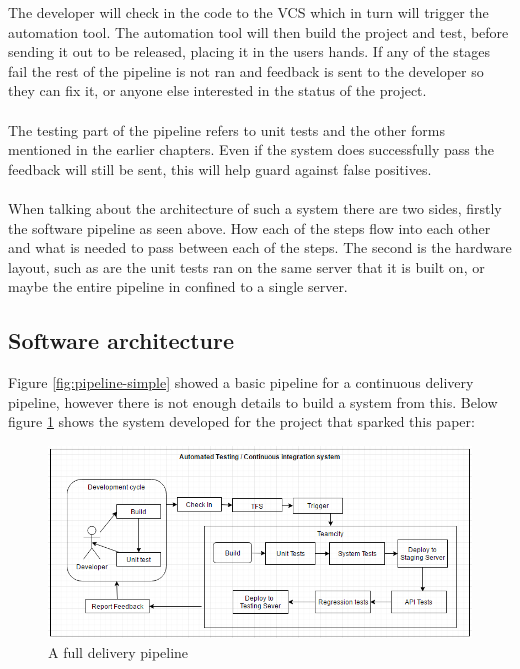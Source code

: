 The developer will check in the code to the VCS which in turn will trigger the automation tool. The automation tool will then build the project and test, before sending it out to be released, placing it in the users hands. If any of the stages fail the rest of the pipeline is not ran and feedback is sent to the developer so they can fix it, or anyone else interested in the status of the project. 
\\\\
The testing part of the pipeline refers to unit tests and the other forms mentioned in the earlier chapters. Even if the system does successfully pass the feedback will still be sent, this will help guard against false positives.
\\\\
When talking about the architecture of such a system there are two sides, firstly the software pipeline as seen above. How each of the steps flow into each other and what is needed to pass between each of the steps. The second is the hardware layout,  such as are the unit tests ran on the same server that it is built on, or maybe the entire pipeline in confined to a single server.

\subsection{Software architecture}
\label{sec:testing}

Figure \ref{fig:pipeline-simple} showed a basic pipeline for a continuous delivery pipeline, however there is not enough details to build a system from this. Below figure \ref{fig:bsipipeline} shows the system developed for the project that sparked this paper:

\begin{figure}[H]
	\centering
	\includegraphics[scale=0.6]{images/bsipipleine.png}
	\caption{A full delivery pipeline}
	\label{fig:bsipipeline}
\end{figure}


